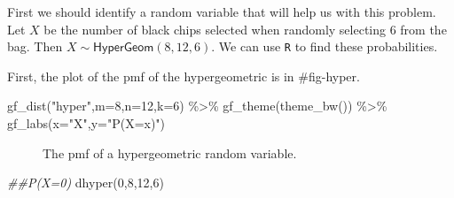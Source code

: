 \documentclass[
  letterpaper,
  DIV=11,
  numbers=noendperiod]{scrreprt}
\newenvironment{Shaded}{\begin{snugshade}}{\end{snugshade}}
\newcommand{\AttributeTok}[1]{\textcolor[rgb]{0.40,0.45,0.13}{#1}}
\newcommand{\DecValTok}[1]{\textcolor[rgb]{0.68,0.00,0.00}{#1}}
\newcommand{\DocumentationTok}[1]{\textcolor[rgb]{0.37,0.37,0.37}{\textit{#1}}}
\newcommand{\FunctionTok}[1]{\textcolor[rgb]{0.28,0.35,0.67}{#1}}
\newcommand{\NormalTok}[1]{\textcolor[rgb]{0.00,0.23,0.31}{#1}}
\newcommand{\SpecialCharTok}[1]{\textcolor[rgb]{0.37,0.37,0.37}{#1}}
\newcommand{\StringTok}[1]{\textcolor[rgb]{0.13,0.47,0.30}{#1}}
\begin{document}
First we should identify a random variable that will help us with this
problem. Let \(X\) be the number of black chips selected when randomly
selecting 6 from the bag. Then \(X\sim \textsf{HyperGeom}(8,12,6)\). We
can use \texttt{R} to find these probabilities.

First, the plot of the pmf of the hypergeometric is in \#fig-hyper.

\begin{Shaded}
\begin{Highlighting}[]
\FunctionTok{gf\_dist}\NormalTok{(}\StringTok{"hyper"}\NormalTok{,}\AttributeTok{m=}\DecValTok{8}\NormalTok{,}\AttributeTok{n=}\DecValTok{12}\NormalTok{,}\AttributeTok{k=}\DecValTok{6}\NormalTok{) }\SpecialCharTok{\%\textgreater{}\%}
  \FunctionTok{gf\_theme}\NormalTok{(}\FunctionTok{theme\_bw}\NormalTok{()) }\SpecialCharTok{\%\textgreater{}\%}
  \FunctionTok{gf\_labs}\NormalTok{(}\AttributeTok{x=}\StringTok{"X"}\NormalTok{,}\AttributeTok{y=}\StringTok{"P(X=x)"}\NormalTok{)}
\end{Highlighting}
\end{Shaded}

\begin{figure}[H]


\caption{\label{fig-hyper}The pmf of a hypergeometric random variable.}

\end{figure}%

\begin{Shaded}
\begin{Highlighting}[]
\DocumentationTok{\#\#P(X=0)}
\FunctionTok{dhyper}\NormalTok{(}\DecValTok{0}\NormalTok{,}\DecValTok{8}\NormalTok{,}\DecValTok{12}\NormalTok{,}\DecValTok{6}\NormalTok{)}
\end{Highlighting}
\end{Shaded}
\end{document}
